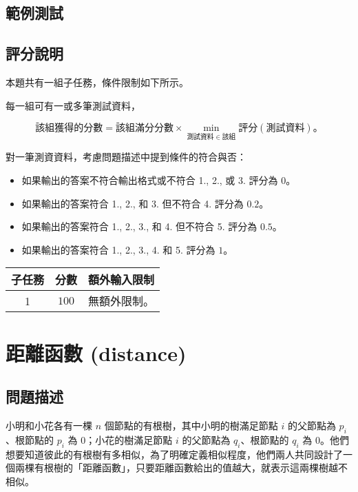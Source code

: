 \subsection{範例測試}

\begin{example}
%
%
%
\end{example}

\subsection{評分說明}

本題共有一組子任務，條件限制如下所示。

每一組可有一或多筆測試資料，

\[該組獲得的分數 = 該組滿分分數\times \min_{測試資料 \in 該組} 評分(測試資料)。\]

對一筆測資資料，考慮問題描述中提到條件的符合與否：

\begin{itemize}
\tightlist
\item
  如果輸出的答案不符合輸出格式或不符合 1., 2., 或 3. 評分為 \(0\)。
\item
  如果輸出的答案符合 1., 2., 和 3. 但不符合 4. 評分為 \(0.2\)。
\item
  如果輸出的答案符合 1., 2., 3., 和 4. 但不符合 5. 評分為 \(0.5\)。
\item
  如果輸出的答案符合 1., 2., 3., 4. 和 5. 評分為 \(1\)。
\end{itemize}

\begin{longtable}[]{@{}ccl@{}}
\toprule
子任務 & 分數 & 額外輸入限制 \\
\midrule
\endhead
1 & \(100\) & 無額外限制。 \\
\bottomrule
\end{longtable}

\section{距離函數 (distance)}

\subsection{問題描述}

小明和小花各有一棵 \(n\) 個節點的有根樹，其中小明的樹滿足節點 \(i\)
的父節點為 \(p_i\)、根節點的 \(p_i\) 為 \(0\)；小花的樹滿足節點 \(i\)
的父節點為 \(q_i\)、根節點的 \(q_i\) 為
\(0\)。他們想要知道彼此的有根樹有多相似，為了明確定義相似程度，他們兩人共同設計了一個兩棵有根樹的「距離函數」，只要距離函數給出的值越大，就表示這兩棵樹越不相似。

